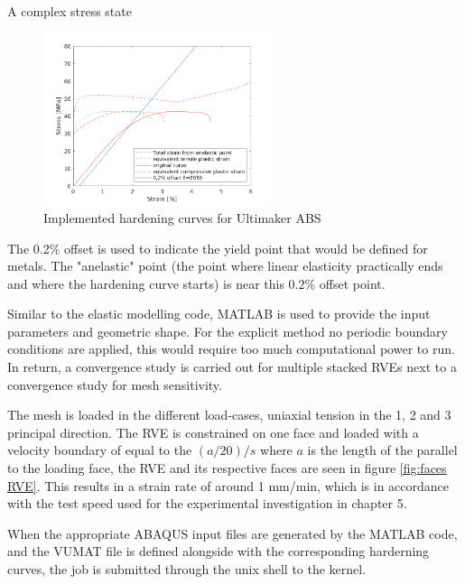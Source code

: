 A complex stress state 

\begin{figure}[H]
    \centering
    \includegraphics[width=0.60\textwidth]{chapter_7_non-elasticmodelling/figures/Hardening.png}
    \caption{Implemented hardening curves for Ultimaker ABS}
    \label{fig:hardening}
\end{figure}

The 0.2\% offset is used to indicate the yield point that would be defined for metals. The "anelastic" point (the point where linear elasticity practically ends and  where the hardening curve starts) is near this 0.2\% offset point. 

Similar to the elastic modelling code, MATLAB is used to provide the input parameters and geometric shape. For the explicit method no periodic boundary conditions are applied, this would require too much computational power to run. In return, a convergence study is carried out for multiple stacked RVEs next to a convergence study for mesh sensitivity. 

The mesh is loaded in the different load-cases, uniaxial tension in the 1, 2 and 3 principal direction. The RVE is constrained on one face and loaded with a velocity boundary of equal to the $(a/20)/s$ where $a$ is the length of the parallel to the loading face, the RVE and its respective faces are seen in figure \ref{fig:faces RVE}. This results in a strain rate of around 1 mm/min, which is in accordance with the test speed used for the experimental investigation in chapter 5.

When the appropriate ABAQUS input files are generated by the MATLAB code, and the VUMAT file is defined alongside with the corresponding harderning curves, the job is submitted through the unix shell to the kernel.


